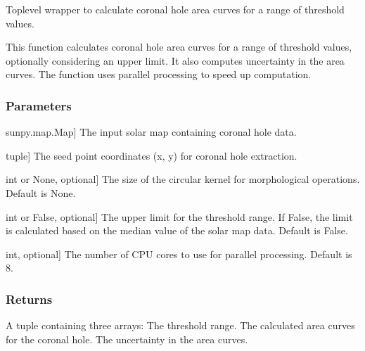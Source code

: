 \documentclass[letterpaper,10pt,english]{sphinxmanual}
\begin{document}
\begin{fulllineitems}
\label{\detokenize{pycatch/utils/ch_mapping:pycatch.utils.ch_mapping.get_curves}}
\pysigstartsignatures
{}
\pysigstopsignatures
\sphinxAtStartPar
Top\sphinxhyphen{}level wrapper to calculate coronal hole area curves for a range of threshold values.

\sphinxAtStartPar
This function calculates coronal hole area curves for a range of threshold values, optionally considering an upper limit. It also computes uncertainty in the area curves. The function uses parallel processing to speed up computation.


\subsubsection{Parameters}
\label{\detokenize{pycatch/utils/ch_mapping:id19}}\begin{description}
\sphinxlineitem{map}{[}sunpy.map.Map{]}
\sphinxAtStartPar
The input solar map containing coronal hole data.

\sphinxlineitem{seed}{[}tuple{]}
\sphinxAtStartPar
The seed point coordinates (x, y) for coronal hole extraction.

\sphinxlineitem{kernel}{[}int or None, optional{]}
\sphinxAtStartPar
The size of the circular kernel for morphological operations. Default is None.

\sphinxlineitem{upper\_lim}{[}int or False, optional{]}
\sphinxAtStartPar
The upper limit for the threshold range. If False, the limit is calculated based on the median value of the solar map data. Default is False.

\sphinxlineitem{cores}{[}int, optional{]}
\sphinxAtStartPar
The number of CPU cores to use for parallel processing. Default is 8.

\end{description}


\subsubsection{Returns}
\label{\detokenize{pycatch/utils/ch_mapping:id20}}\begin{description}
\sphinxAtStartPar
A tuple containing three arrays:
\sphinxhyphen{} The threshold range.
\sphinxhyphen{} The calculated area curves for the coronal hole.
\sphinxhyphen{} The uncertainty in the area curves.

\end{description}

\end{fulllineitems}
\end{document}
